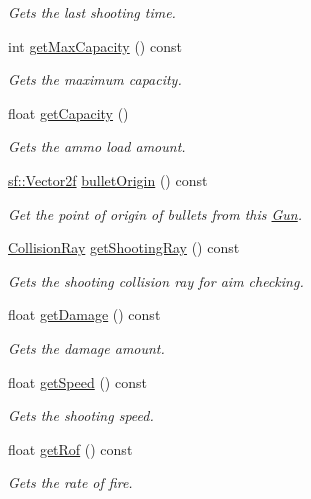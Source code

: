 \begin{DoxyCompactItemize}
\begin{DoxyCompactList}\small\item\em Gets the last shooting time. \end{DoxyCompactList}\item 
int \mbox{\hyperlink{class_gun_a2fcce9b586802009705e7995a84bd0dc}{get\+Max\+Capacity}} () const
\begin{DoxyCompactList}\small\item\em Gets the maximum capacity. \end{DoxyCompactList}\item 
float \mbox{\hyperlink{class_gun_a206957fdc26c83489cca7a7ce69ca239}{get\+Capacity}} ()
\begin{DoxyCompactList}\small\item\em Gets the ammo load amount. \end{DoxyCompactList}\item 
\mbox{\hyperlink{classsf_1_1_vector2}{sf\+::\+Vector2f}} \mbox{\hyperlink{class_gun_a9cfd56953f4a4bceeff88c4b2946676e}{bullet\+Origin}} () const
\begin{DoxyCompactList}\small\item\em Get the point of origin of bullets from this \mbox{\hyperlink{class_gun}{Gun}}. \end{DoxyCompactList}\item 
\mbox{\hyperlink{class_collision_ray}{Collision\+Ray}} \mbox{\hyperlink{class_gun_add9d24776b386d2cbc934e7fcff4ecf8}{get\+Shooting\+Ray}} () const
\begin{DoxyCompactList}\small\item\em Gets the shooting collision ray for aim checking. \end{DoxyCompactList}\item 
float \mbox{\hyperlink{class_gun_a6f42c3ba24464b315e1b800b05d7720a}{get\+Damage}} () const
\begin{DoxyCompactList}\small\item\em Gets the damage amount. \end{DoxyCompactList}\item 
float \mbox{\hyperlink{class_gun_a634b932ce487fb5f3c744d4909bb34e5}{get\+Speed}} () const
\begin{DoxyCompactList}\small\item\em Gets the shooting speed. \end{DoxyCompactList}\item 
float \mbox{\hyperlink{class_gun_a675a9dabf30c40a19c43364a5fa0e03b}{get\+Rof}} () const
\begin{DoxyCompactList}\small\item\em Gets the rate of fire. \end{DoxyCompactList}\item 

\end{DoxyCompactItemize}
